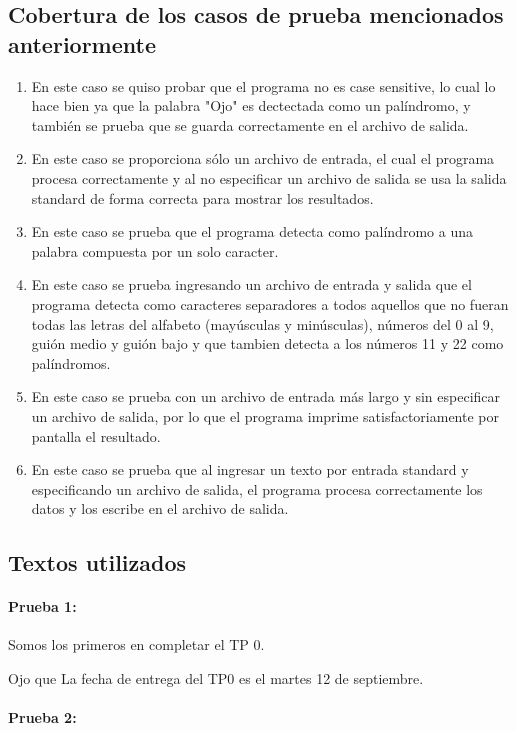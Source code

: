 \documentclass[a4paper]{article}
\begin{document}
\pagebreak

\subsection{Cobertura de los casos de prueba mencionados anteriormente}
\begin{enumerate}
\item En este caso se quiso probar que el programa no es case sensitive, lo cual lo hace bien ya que la palabra "Ojo" es dectectada como un palíndromo, y también se prueba que se guarda correctamente en el archivo de salida.
\item En este caso se proporciona sólo un archivo de entrada, el cual el programa procesa correctamente y al no especificar un archivo de salida se usa la salida standard de forma correcta para mostrar los resultados. 
\item En este caso se prueba que el programa detecta como palíndromo a una palabra compuesta por un solo caracter.
\item En este caso se prueba ingresando un archivo de entrada y salida que el programa detecta como caracteres separadores a todos aquellos que no fueran todas las letras del alfabeto (mayúsculas y minúsculas), números del 0 al 9, guión medio y guión bajo y que tambien detecta a los números 11 y 22 como palíndromos.
\item En este caso se prueba con un archivo de entrada más largo y sin especificar un archivo de salida, por lo que el programa imprime satisfactoriamente por pantalla el resultado.
\item En este caso se prueba que al ingresar un texto por entrada standard y especificando un archivo de salida, el programa procesa correctamente los datos y los escribe en el archivo de salida.
\end{enumerate}

\subsection{Textos utilizados}

\paragraph{Prueba 1:}

Somos los primeros en completar el TP 0.

Ojo que La fecha de entrega del TP0 es el martes 12 de septiembre.

\paragraph{Prueba 2:}
\end{document}
